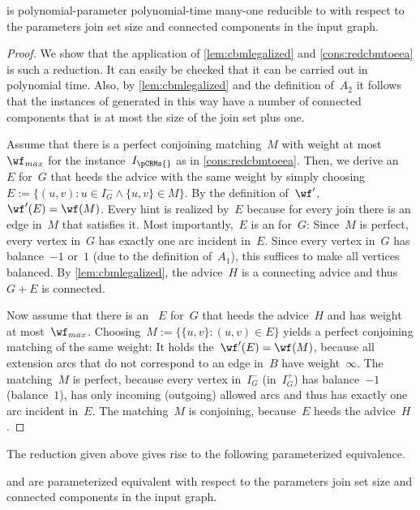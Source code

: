 \begin{theorem}\label{the:redcbmtowmeea}
  \pCBM{} is polynomial-parameter polynomial-time many-one reducible to \pWMEEA{} with respect to the parameters join set size and connected components in the input graph.
\end{theorem}
\begin{proof}
  We show that the application of \autoref{lem:cbmlegalized} and \autoref{cons:redcbmtoeea} is such a reduction. It can easily be checked that it can be carried out in polynomial time. Also, by \autoref{lem:cbmlegalized} and the definition of~$A_2$ it follows that the instances of \pWMEEAs{} generated in this way have a number of connected components that is at most the size of the join set plus one.

  Assume that there is a perfect conjoining matching~$M$ with weight at most~$\wf_{max}$ for the instance~$I_\pCBMs{}$ as in \autoref{cons:redcbmtoeea}. Then, we derive an \EE{}~$E$ for~$G$ that heeds the advice with the same weight by simply choosing~$E := \{(u, v) : u \in I^-_G \wedge \{u, v\} \in M\}$. By the definition of~$\wf'$,~$\wf'(E) = \wf(M)$. Every hint is realized by~$E$ because for every join there is an edge in~$M$ that satisfies it. Most importantly,~$E$ is an \EE{} for~$G$: Since~$M$ is perfect, every vertex in~$G$ has exactly one arc incident in~$E$. Since every vertex in~$G$ has balance~$-1$ or~$1$ (due to the definition of~$A_1$), this suffices to make all vertices balanced. By \autoref{lem:cbmlegalized}, the advice~$H$ is a connecting advice and thus~$G + E$ is connected.

  Now assume that there is an \EE{}~$E$ for~$G$ that heeds the advice~$H$ and has weight at most~$\wf_{max}$. Choosing~$M := \{\{u, v\} : (u, v) \in E\}$ yields a perfect conjoining matching of the same weight: It holds the~$\wf'(E) = \wf(M)$, because all extension arcs that do not correspond to an edge in~$B$ have weight~$\infty$. The matching~$M$ is perfect, because every vertex in~$I_G^-$ (in~$I_G^+$) has balance~$-1$ (balance~$1$), has only incoming (outgoing) allowed arcs and thus has exactly one arc incident in~$E$. The matching~$M$ is conjoining, because~$E$ heeds the advice~$H$.
\end{proof}
The reduction given above gives rise to the following parameterized equivalence.
\begin{theorem}\label{the:cbmwmeeequiv}
  \pCBM{} and \pWMEE{} are parameterized equivalent with respect to the parameters join set size and connected components in the input graph. 
\end{theorem}

